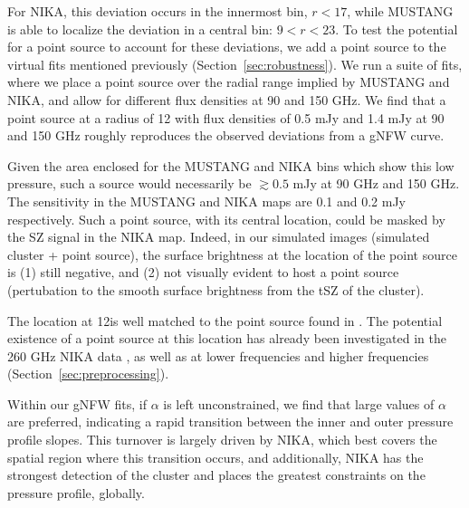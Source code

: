 \documentclass[twocolumn,traditabstract]{aa}
\begin{document}
For NIKA, this deviation occurs in the innermost bin, $r < 17$\asec, while MUSTANG is able to localize the
deviation in a central bin: $9 < r < 23$\asec. To test the potential for a point source to account for these
deviations, we add a point source to the virtual fits mentioned previously (Section~\ref{sec:robustness}).
We run a suite of fits, where we place a point source over the radial range implied by MUSTANG and NIKA,
and allow for different flux densities at 90 and 150 GHz. We find that a point source at a radius of 12\asecs
with flux densities of 0.5 mJy and 1.4 mJy at 90 and 150 GHz roughly reproduces the observed deviations from
a gNFW curve.

Given the area enclosed for the MUSTANG and NIKA bins which
show this low pressure, such a source would necessarily be $\gtrsim 0.5$ mJy at 90 GHz and 150 GHz.
The sensitivity in the MUSTANG and NIKA maps are 0.1 and 0.2 mJy respectively. Such a point source,
with its central location, could be masked by the SZ signal in the NIKA map. Indeed, in our simulated
images (simulated cluster + point source), the surface brightness at the location of the point source
is (1) still negative, and (2) not visually evident to host a point source (pertubation to the smooth
surface brightness from the tSZ of the cluster).

The location at 12\asecs is well matched to the point source found in \citet{korngut2011}. The potential
existence of a point source at this location has already been investigated in the 260 GHz NIKA data
\citep{adam2015}, as well as at lower frequencies and higher frequencies (Section~\ref{sec:preprocessing}).


Within our gNFW fits, if $\alpha$ is left unconstrained, we find that large values of $\alpha$ are preferred,
indicating a rapid transition between the inner and outer pressure profile slopes. This turnover is largely
driven by NIKA, which best covers the spatial region where this transition occurs, and additionally, NIKA
has the strongest detection of the cluster and places the greatest constraints on the pressure profile, globally.
\end{document}
